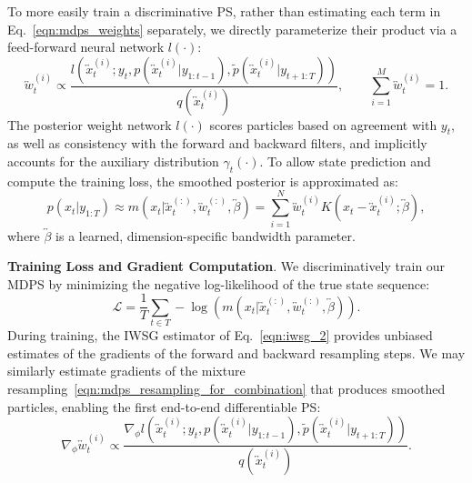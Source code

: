     To more easily train a discriminative PS, rather than estimating each term in Eq.~\eqref{eqn:mdps_weights} separately, we directly parameterize their product via a feed-forward neural network $l(\cdot)$: 
    \begin{equation}
        \overleftrightarrow{w}_{t}^{(i)} \propto \frac{l(\overleftrightarrow{x}_{t}^{(i)}; y_t, p(\overleftrightarrow{x}_{t}^{(i)}|y_{1:t-1}), \tilde{p}(\overleftrightarrow{x}_{t}^{(i)}| y_{t+1:T}))}{q(\overleftrightarrow{x}_{t}^{(i)})},
        \qquad \sum_{i=1}^{M} \overleftrightarrow{w}_{t}^{(i)} = 1.
        \label{eqn:mdps_weights_nn}
    \end{equation} 
    The posterior weight network $l(\cdot)$ scores particles based on agreement with $y_t$, as well as consistency with the forward and backward filters, and implicitly accounts for the auxiliary distribution $\gamma_t(\cdot)$.  To allow state prediction and compute the training loss, the  smoothed posterior is approximated as:
    \begin{equation}
        p(x_t|y_{1:T}) \approx m(x_t| \overleftrightarrow{x}_{t}^{(:)}, \overleftrightarrow{w}_{t}^{(:)}, \overleftrightarrow{\beta})=\sum_{i=1}^N  \overleftrightarrow{w}_{t}^{(i)} K(x_t - \overleftrightarrow{x}_{t}^{(i)}; \overleftrightarrow{\beta}),
        \label{eqn:smoothed_posterior}
    \end{equation}    
    where $\overleftrightarrow{\beta}$ is a learned, dimension-specific bandwidth parameter.
    
    
    \textbf{Training Loss and Gradient Computation}. We discriminatively train our MDPS by minimizing the negative log-likelihood of the true state sequence: %
    \begin{equation}
        \mathcal{L} = \frac{1}{T} \sum_{t\in T} -\log(m(x_t | \overleftrightarrow{x}_{t}^{(:)}, \overleftrightarrow{w}_{t}^{(:)}, \overleftrightarrow{\beta})).
    \end{equation}
    During training, the IWSG estimator of Eq.~\eqref{eqn:iwsg_2} provides unbiased estimates of the gradients of the forward and backward resampling steps.  We may similarly estimate gradients of the mixture resampling~\eqref{eqn:mdps_resampling_for_combination} that produces smoothed particles,
    enabling the first end-to-end differentiable PS:
    \begin{equation}
        \nabla_{\phi }\overleftrightarrow{w}_{t}^{(i)} \propto \frac{\nabla_{\phi }l(\overleftrightarrow{x}_{t}^{(i)}; y_t, p(\overleftrightarrow{x}_{t}^{(i)}|y_{1:t-1}), \tilde{p}(\overleftrightarrow{x}_{t}^{(i)}| y_{t+1:T}))}{q(\overleftrightarrow{x}_{t}^{(i)})}.
        \label{eqn:mdps_weights_nn_diffy}
    \end{equation} 
    
